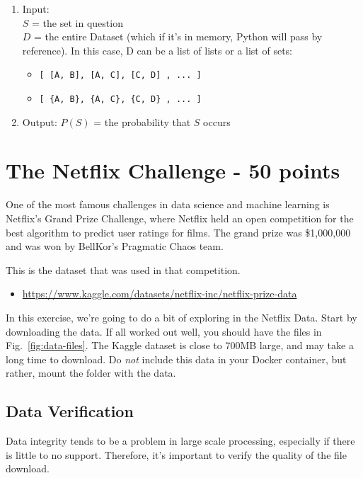 \documentclass[paper=a4, fontsize=11pt]{scrartcl} %
\begin{document}
\begin{enumerate}
\begin{enumerate}
	      \item Input: \\ $S$ = the set in question \\ $D$ = the entire Dataset (which if it's in memory, Python will pass by reference). In this case, D can be a list of lists or a list of sets: 
		      \begin{itemize}
			      \item \verb"[ [A, B], [A, C], [C, D] , ... ]"
			      \item \verb"[ {A, B}, {A, C}, {C, D} , ... ]"
		      \end{itemize}
      \item Output: $P(S)$ = the probability that $S$ occurs
      \end{enumerate}
\end{enumerate}


\section{The Netflix Challenge - 50 points}

One of the most famous challenges in data science and machine learning is Netflix's Grand Prize Challenge, where Netflix held an open competition for the best algorithm to predict user ratings for films. The grand prize was \$1,000,000 and was won by BellKor's Pragmatic Chaos team. 

This is the dataset that was used in that competition.
\begin{itemize}
    \item \url{https://www.kaggle.com/datasets/netflix-inc/netflix-prize-data}
\end{itemize}

In this exercise, we're going to do a bit of exploring in the Netflix Data. Start by downloading the data. If all worked out well, you should have the files in Fig.~\ref{fig:data-files}. The Kaggle dataset is close to 700MB large, and may take a long time to download. Do \emph{not} include this data in your Docker container, but rather, mount the folder with the data.

\subsection{Data Verification}

Data integrity tends to be a problem in large scale processing, especially if there is little to no support. Therefore, it's important to verify the quality of the file download. 
\end{document}
